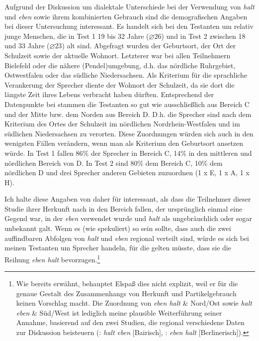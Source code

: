 Aufgrund der Diskussion um dialektale Unterschiede bei der Verwendung von \textit{halt} und \textit{eben} sowie ihrem kombinierten Gebrauch sind die demografischen Anga\-ben bei dieser Untersuchung interessant. Es handelt sich bei den Testanten um relativ junge Menschen, die in Test 1 19 bis 32 Jahre ($\diameter 26$) und in Test 2 zwi\-schen 18 und 33 Jahre ($\diameter 23$) alt sind. Abgefragt wurden der Geburts\-ort, der Ort der Schulzeit sowie der aktuelle Wohnort. Letzterer war bei allen Teilnehmern Bielefeld oder die nähere (Pendel)umgebung, d.h. das nördliche Ruhrgebiet, Ost\-westfalen oder das südliche Niedersachsen. Als Kriterium für die sprachliche Verankerung der Sprecher diente der Wohnort der Schulzeit, da sie dort die längste Zeit ihres Lebens verbracht haben dürften. Entsprechend der Datenpunkte bei \citet{Eichhoff1978} stammen die Testanten so gut wie ausschließlich aus Be\-reich C und der Mitte bzw. dem Norden aus Bereich D. D.h. die Sprecher sind nach dem Kriterium des Ortes der Schulzeit im nördlichen Nordrhein-Westfalen und im südlichen Niedersachsen zu verorten. Diese Zuordnungen würden sich auch in den wenigsten Fällen verändern, wenn man als Kriterium den Geburts\-ort ansetzen würde. In Test 1 fallen 86\% der Sprecher in Bereich C, 14\% in den mittleren und nördlichen Bereich von D. In Test 2 sind 80\% dem Bereich C, 10\% dem nördlichen D und drei Sprecher anderen Gebieten zuzuordnen (1 x E, 1 x A, 1 x H).

Ich halte diese Angaben von daher für interessant, als dass die Teilnehmer dieser Studie ihrer Herkunft nach in den Bereich fallen, der ursprünglich einmal eine Gegend war, in der \textit{eben} verwendet wurde und \textit{halt} als ungebräuchlich oder sogar unbekannt galt. Wenn es (wie \citealt[17, Fn 41]{Elspass2005} spekuliert) so sein sollte, dass auch die zwei auffindbaren Abfolgen von \textit{halt} und \textit{eben} regional verteilt sind, würde es sich bei meinen Testanten um Sprecher handeln, für die gelten müsste, dass sie die Reihung \textit{eben halt} bevorzugen.\footnote{Wie bereits erwähnt, behauptet Elspaß dies nicht explizit, weil er für die genaue Gestalt des Zusammenhangs von Herkunft und Partikelgebrauch keinen Vorschlag macht. Die Zuordnung von \textit{eben halt} \& Nord/Ost sowie \textit{halt eben} \& Süd/West ist lediglich meine plausible Weiterführung seiner Annahme, basierend auf den zwei Studien, die regional verschiedene Daten zur Diskussion beisteuern (\citealt{Thurmair1989}: \textit{halt eben} $[$Bairisch$]$, \citealt{Dittmar2000}: \textit{eben halt} $[$Berlinerisch$]$).}

